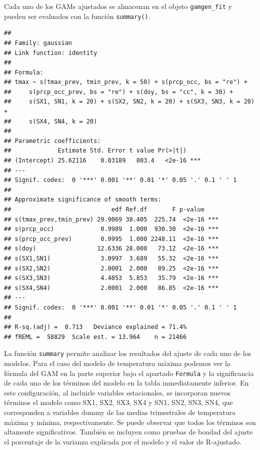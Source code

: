 \documentclass[
  12pt]{article}
\newenvironment{Shaded}{}{}
\newcommand{\CommentTok}[1]{\textcolor[rgb]{0.38,0.63,0.69}{\textit{#1}}}
\newcommand{\DataTypeTok}[1]{\textcolor[rgb]{0.56,0.13,0.00}{#1}}
\newcommand{\KeywordTok}[1]{\textcolor[rgb]{0.00,0.44,0.13}{\textbf{#1}}}
\newcommand{\NormalTok}[1]{#1}
\newcommand{\OperatorTok}[1]{\textcolor[rgb]{0.40,0.40,0.40}{#1}}
\newcommand{\StringTok}[1]{\textcolor[rgb]{0.25,0.44,0.63}{#1}}
\begin{document}
Cada uno de los GAMs ajustados se almacenan en el objeto \texttt{gamgen\_fit} y pueden ser evaluados con la función \texttt{summary()}.

\begin{Shaded}
\end{Shaded}

\begin{verbatim}
## 
## Family: gaussian 
## Link function: identity 
## 
## Formula:
## tmax ~ s(tmax_prev, tmin_prev, k = 50) + s(prcp_occ, bs = "re") + 
##     s(prcp_occ_prev, bs = "re") + s(doy, bs = "cc", k = 30) + 
##     s(SX1, SN1, k = 20) + s(SX2, SN2, k = 20) + s(SX3, SN3, k = 20) + 
##     s(SX4, SN4, k = 20)
## 
## Parametric coefficients:
##             Estimate Std. Error t value Pr(>|t|)    
## (Intercept) 25.62116    0.03189   803.4   <2e-16 ***
## ---
## Signif. codes:  0 '***' 0.001 '**' 0.01 '*' 0.05 '.' 0.1 ' ' 1
## 
## Approximate significance of smooth terms:
##                            edf Ref.df       F p-value    
## s(tmax_prev,tmin_prev) 29.9069 38.405  225.74  <2e-16 ***
## s(prcp_occ)             0.9989  1.000  930.30  <2e-16 ***
## s(prcp_occ_prev)        0.9995  1.000 2248.11  <2e-16 ***
## s(doy)                 12.6336 28.000   73.12  <2e-16 ***
## s(SX1,SN1)              3.0997  3.689   55.32  <2e-16 ***
## s(SX2,SN2)              2.0001  2.000   89.25  <2e-16 ***
## s(SX3,SN3)              4.4053  5.853   35.79  <2e-16 ***
## s(SX4,SN4)              2.0001  2.000   86.85  <2e-16 ***
## ---
## Signif. codes:  0 '***' 0.001 '**' 0.01 '*' 0.05 '.' 0.1 ' ' 1
## 
## R-sq.(adj) =  0.713   Deviance explained = 71.4%
## fREML =  58829  Scale est. = 13.964    n = 21466
\end{verbatim}

La función \texttt{summary} permite analizar los resultados del ajuste de cada uno de los modelos. Para el caso del modelo de temperatura máxima podemos ver la fórmula del GAM en la parte superior bajo el apartado \texttt{Formula} y la significancia de cada uno de los términos del modelo en la tabla inmediatamente inferior. En este configuración, al incluirle variables estacionales, se incorporan nuevos términos el modelo como SX1, SX2, SX3, SX4 y SN1, SN2, SN3, SN4, que corresponden a variables dummy de las medias trimestrales de temperatura máxima y mínima, respectivamente. Se puede observar que todos los términos son altamente significativos. También se incluyen como pruebas de bondad del ajuste el porcentaje de la varianza explicada por el modelo y el valor de R-ajustado.
\end{document}
